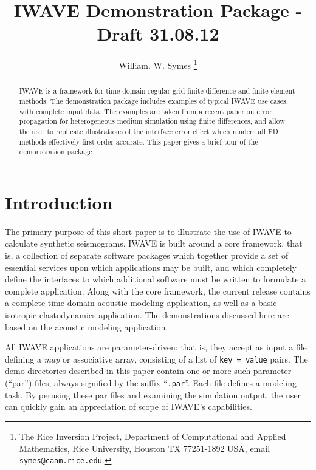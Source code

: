\title{IWAVE Demonstration Package - Draft 31.08.12}
\author{William. W. Symes \thanks{The Rice Inversion Project,
Department of Computational and Applied Mathematics, Rice University,
Houston TX 77251-1892 USA, email {\tt symes@caam.rice.edu}.}}

\maketitle

\begin{abstract}
  IWAVE is a framework for time-domain regular grid finite difference
  and finite element methods. The demonstration package includes
  examples of typical IWAVE use cases, with complete input data. The
  examples are taken from a recent paper on error propagation for
  heterogeneous medium simulation using finite differences, and allow
  the user to replicate illustrations of the interface error effect
  which renders all FD methods effectively first-order accurate.  This
  paper gives a brief tour of the demonstration package.
\end{abstract}

\section{Introduction}
The primary purpose of this short paper is to illustrate the use of
IWAVE to calculate synthetic seismograms. IWAVE is built around a core
framework, that is, a collection of separate software packages which
together provide a set of essential services upon which applications
may be built, and which completely define the interfaces to which
additional software must be written to formulate a complete
application. Along with the core framework, the current release
contains a complete time-domain acoustic modeling application, as well
as a basic isotropic elastodynamics application.  The demonstrations
discussed here are based on the acoustic modeling application.

All IWAVE applications are parameter-driven: that is, they accept as
input a file defining a {\em map} or associative array, consisting of
a list of {\tt key = value} pairs. The demo directories described in
this paper contain one or more such parameter (``par'') files, always
signified by the suffix ``{\tt .par}''. Each file defines a modeling
task. By perusing these par files and examining the simulation output,
the user can quickly gain an appreciation of scope of IWAVE's
capabilities.

